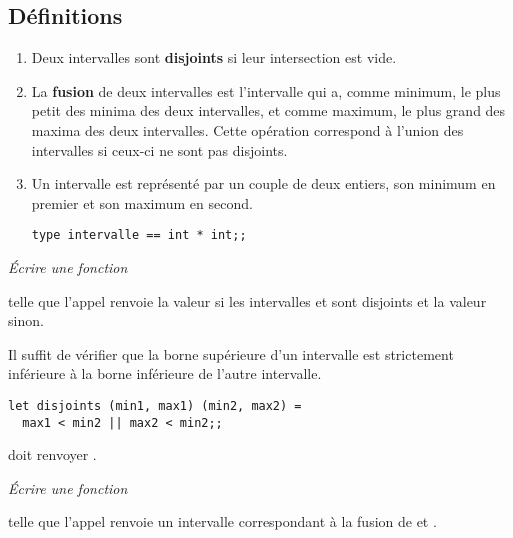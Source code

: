 \subsection{Définitions}
\begin{enumerate}
  \item Deux intervalles sont {\bf disjoints} si leur intersection est vide.
  \item La {\bf fusion} de deux intervalles est l'intervalle qui a, comme minimum, le plus petit des
minima des deux intervalles, et comme maximum, le plus grand des maxima des deux intervalles.
Cette opération correspond à l'union des intervalles si ceux-ci ne sont pas disjoints.
\item Un intervalle est représenté par un couple de deux entiers, son minimum en premier et son maximum en second.
\begin{lstlisting}
type intervalle == int * int;;
\end{lstlisting}
\end{enumerate}
\begin{Exercise}\it
Écrire une fonction 

telle que l'appel  renvoie la valeur  si les intervalles  et 
sont disjoints et la valeur  sinon.
\end{Exercise}
\begin{Answer}
Il suffit de vérifier que la borne supérieure d'un intervalle est strictement inférieure à la borne inférieure de l'autre intervalle.
\begin{lstlisting}
let disjoints (min1, max1) (min2, max2) = 
  max1 < min2 || max2 < min2;;
\end{lstlisting}
\end{Answer}
\smallskip
{} doit renvoyer .
\begin{Exercise}\it
Écrire une fonction 

telle que l'appel  renvoie un intervalle correspondant à la
fusion de  et .
\end{Exercise}
